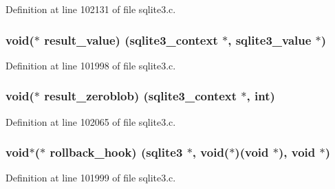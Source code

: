 Definition at line 102131 of file sqlite3.\+c.

\hypertarget{structsqlite3__api__routines_a901b5a6ff17bfe95b691c27ee941c326}{}
\subsubsection[{result\+\_\+value}]{\setlength{\rightskip}{0pt plus 5cm}void($\ast$ result\+\_\+value) ({\bf sqlite3\+\_\+context} $\ast$, sqlite3\+\_\+value $\ast$)}\label{structsqlite3__api__routines_a901b5a6ff17bfe95b691c27ee941c326}


Definition at line 101998 of file sqlite3.\+c.

\hypertarget{structsqlite3__api__routines_a34442387580fc801fe447b0b01a832ec}{}
\subsubsection[{result\+\_\+zeroblob}]{\setlength{\rightskip}{0pt plus 5cm}void($\ast$ result\+\_\+zeroblob) ({\bf sqlite3\+\_\+context} $\ast$, int)}\label{structsqlite3__api__routines_a34442387580fc801fe447b0b01a832ec}


Definition at line 102065 of file sqlite3.\+c.

\hypertarget{structsqlite3__api__routines_ab42e52c0ffe58ae495cc2e799fc8275b}{}
\subsubsection[{rollback\+\_\+hook}]{\setlength{\rightskip}{0pt plus 5cm}void$\ast$($\ast$ rollback\+\_\+hook) ({\bf sqlite3} $\ast$, void($\ast$)(void $\ast$), void $\ast$)}\label{structsqlite3__api__routines_ab42e52c0ffe58ae495cc2e799fc8275b}


Definition at line 101999 of file sqlite3.\+c.

\hypertarget{structsqlite3__api__routines_afdbfe4085932e5c2bfadf5b4b8d2278b}{}
